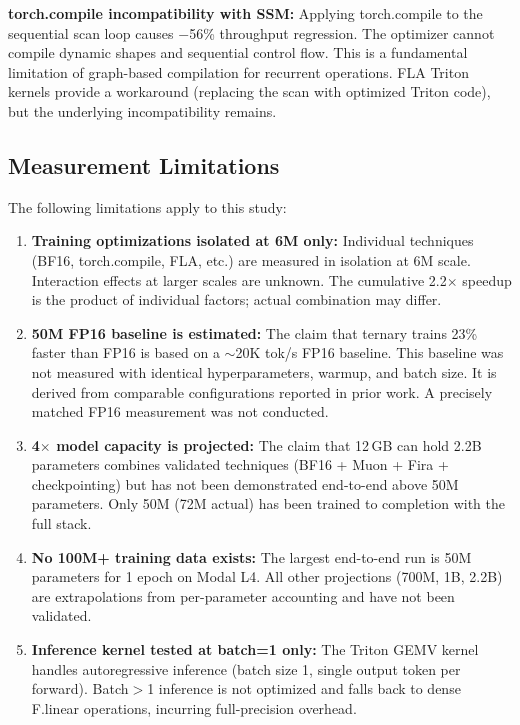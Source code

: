 \documentclass{article}
\begin{document}
\textbf{torch.compile incompatibility with SSM:} Applying torch.compile to the sequential scan loop causes $-$56\% throughput regression. The optimizer cannot compile dynamic shapes and sequential control flow. This is a fundamental limitation of graph-based compilation for recurrent operations. FLA Triton kernels provide a workaround (replacing the scan with optimized Triton code), but the underlying incompatibility remains.

\subsection{Measurement Limitations}

The following limitations apply to this study:

\begin{enumerate}
\item \textbf{Training optimizations isolated at 6M only:} Individual techniques (BF16, torch.compile, FLA, etc.) are measured in isolation at 6M scale. Interaction effects at larger scales are unknown. The cumulative 2.2$\times$ speedup is the product of individual factors; actual combination may differ.

\item \textbf{50M FP16 baseline is estimated:} The claim that ternary trains 23\% faster than FP16 is based on a $\sim$20K tok/s FP16 baseline. This baseline was not measured with identical hyperparameters, warmup, and batch size. It is derived from comparable configurations reported in prior work. A precisely matched FP16 measurement was not conducted.

\item \textbf{4$\times$ model capacity is projected:} The claim that 12\,GB can hold 2.2B parameters combines validated techniques (BF16 + Muon + Fira + checkpointing) but has not been demonstrated end-to-end above 50M parameters. Only 50M (72M actual) has been trained to completion with the full stack.

\item \textbf{No 100M+ training data exists:} The largest end-to-end run is 50M parameters for 1 epoch on Modal L4. All other projections (700M, 1B, 2.2B) are extrapolations from per-parameter accounting and have not been validated.

\item \textbf{Inference kernel tested at batch=1 only:} The Triton GEMV kernel handles autoregressive inference (batch size 1, single output token per forward). Batch$>$1 inference is not optimized and falls back to dense F.linear operations, incurring full-precision overhead.
\end{enumerate}
\end{document}
